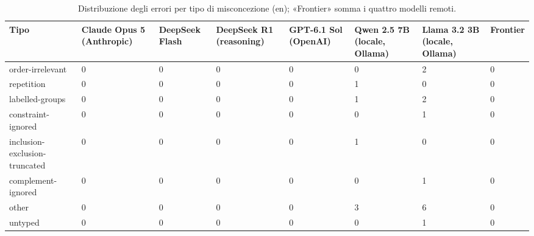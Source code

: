 \begin{table}[htbp]
\centering\small
\begin{tabularx}{\textwidth}{lXXXXXXX}
\toprule
Tipo & Claude Opus 5 (Anthropic) & DeepSeek Flash & DeepSeek R1 (reasoning) & GPT-6.1 Sol (OpenAI) & Qwen 2.5 7B (locale, Ollama) & Llama 3.2 3B (locale, Ollama) & Frontier \\
\midrule
order-irrelevant & 0 & 0 & 0 & 0 & 0 & 2 & 0 \\
repetition & 0 & 0 & 0 & 0 & 1 & 0 & 0 \\
labelled-groups & 0 & 0 & 0 & 0 & 1 & 2 & 0 \\
constraint-ignored & 0 & 0 & 0 & 0 & 0 & 1 & 0 \\
inclusion-exclusion-truncated & 0 & 0 & 0 & 0 & 1 & 0 & 0 \\
complement-ignored & 0 & 0 & 0 & 0 & 0 & 1 & 0 \\
other & 0 & 0 & 0 & 0 & 3 & 6 & 0 \\
untyped & 0 & 0 & 0 & 0 & 0 & 1 & 0 \\
\bottomrule
\end{tabularx}
\caption{Distribuzione degli errori per tipo di misconcezione (en); «Frontier» somma i quattro modelli remoti.}
\label{tab:benchmark-misconceptions-en}
\end{table}
